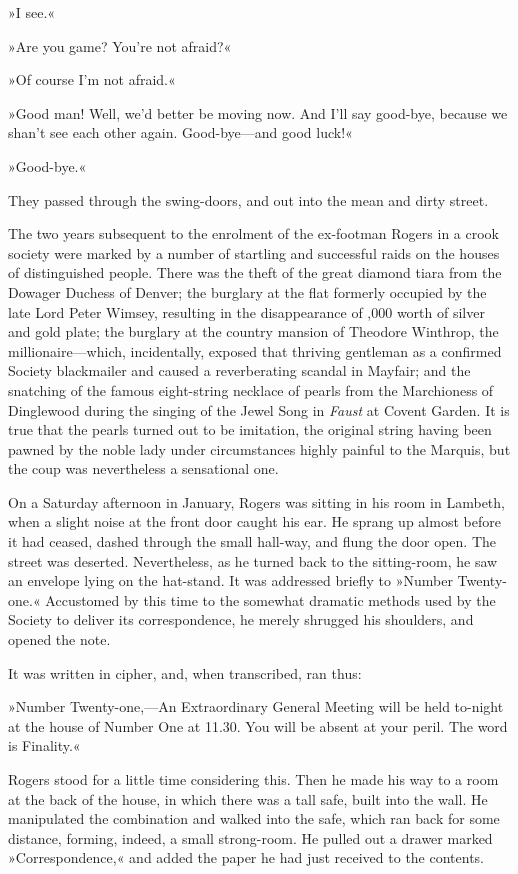 »I see.«

»Are you game? You're not afraid?«

»Of course I'm not afraid.«

»Good man! Well, we'd better be moving now. And I'll say good-bye, because we shan't see each other again. Good-bye—and good luck!«

»Good-bye.«

They passed through the swing-doors, and out into the mean and dirty street.

The two years subsequent to the enrolment of the ex-footman Rogers in a crook society were marked by a number of startling and successful raids on the houses of distinguished people. There was the theft of the great diamond tiara from the Dowager Duchess of Denver; the burglary at the flat formerly occupied by the late Lord Peter Wimsey, resulting in the disappearance of ,000 worth of silver and gold plate; the burglary at the country mansion of Theodore Winthrop, the millionaire—which, incidentally, exposed that thriving gentleman as a confirmed Society blackmailer and caused a reverberating scandal in Mayfair; and the snatching of the famous eight-string necklace of pearls from the Marchioness of Dinglewood during the singing of the Jewel Song in \textit{Faust} at Covent Garden. It is true that the pearls turned out to be imitation, the original string having been pawned by the noble lady under circumstances highly painful to the Marquis, but the coup was nevertheless a sensational one.

On a Saturday afternoon in January, Rogers was sitting in his room in Lambeth, when a slight noise at the front door caught his ear. He sprang up almost before it had ceased, dashed through the small hall-way, and flung the door open. The street was deserted. Nevertheless, as he turned back to the sitting-room, he saw an envelope lying on the hat-stand. It was addressed briefly to »Number Twenty-one.« Accustomed by this time to the somewhat dramatic methods used by the Society to deliver its correspondence, he merely shrugged his shoulders, and opened the note.

It was written in cipher, and, when transcribed, ran thus:

»Number Twenty-one,—An Extraordinary General Meeting will be held to-night at the house of Number One at 11.30. You will be absent at your peril. The word is Finality.«

Rogers stood for a little time considering this. Then he made his way to a room at the back of the house, in which there was a tall safe, built into the wall. He manipulated the combination and walked into the safe, which ran back for some distance, forming, indeed, a small strong-room. He pulled out a drawer marked »Correspondence,« and added the paper he had just received to the contents.

